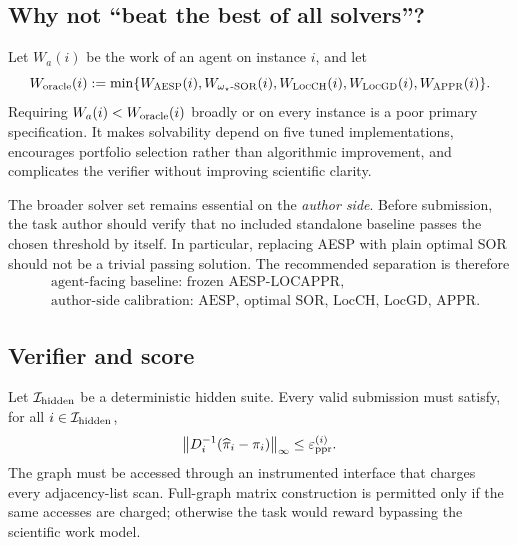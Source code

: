 \subsection{Why not ``beat the best of all solvers''?}

Let \(W_a(i)\) be the work of an agent on instance \(i\), and let
\begin{equation}
  W_{\rm oracle}(i)
  :=\min\{W_{\textsc{AESP}}(i),W_{\omega_\star\text{-SOR}}(i),
            W_{\textsc{LocCH}}(i),W_{\textsc{LocGD}}(i),W_{\textsc{APPR}}(i)\}.
    \label{eq:oracle-baseline}
\end{equation}
Requiring \(W_a(i)<W_{\rm oracle}(i)\) broadly or on every instance is a
poor primary specification.  It makes solvability depend on five tuned
implementations, encourages portfolio selection rather than algorithmic
improvement, and complicates the verifier without improving scientific
clarity.

The broader solver set remains essential on the \emph{author side}.  Before
submission, the task author should verify that no included standalone baseline
passes the chosen threshold by itself.  In particular, replacing AESP with
plain optimal SOR should not be a trivial passing solution.  The recommended
separation is therefore
\begin{equation}
  \boxed{
  \begin{aligned}
  &\text{agent-facing baseline: frozen AESP-LOCAPPR},\\
  &\text{author-side calibration: AESP, optimal SOR, LocCH, LocGD, APPR}.
  \end{aligned}}
  \label{eq:benchmark-separation}
\end{equation}

\subsection{Verifier and score}

Let \(\mathcal I_{\rm hidden}\) be a deterministic hidden suite.  Every valid
submission must satisfy, for all \(i\in\mathcal I_{\rm hidden}\),
\begin{equation}
   \left\lVert D_i^{-1}(\widehat\pi_i-\pi_i)\right\rVert_\infty\leq\varepsilon_{\mathrm{ppr}}^{(i)}.
   \label{eq:benchmark-correctness}
\end{equation}
The graph must be accessed through an instrumented interface that charges every
adjacency-list scan.  Full-graph matrix construction is permitted only if the
same accesses are charged; otherwise the task would reward bypassing the
scientific work model.

